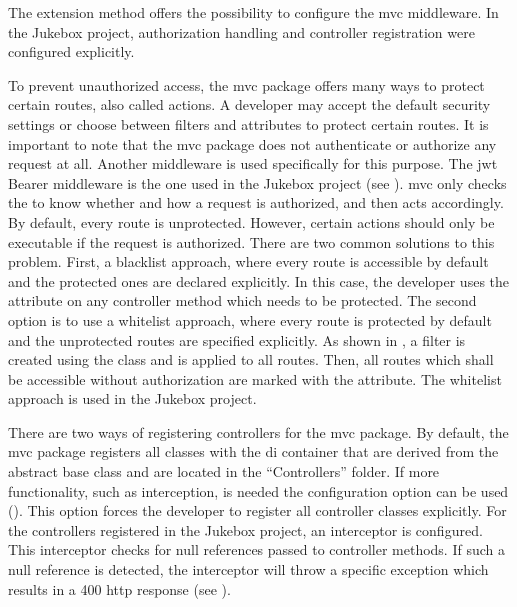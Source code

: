 
The  extension method offers the possibility to configure the \gls{mvc} middleware. In the Jukebox project, authorization handling and controller registration were configured explicitly.

To prevent unauthorized access, the \gls{mvc} package offers many ways to protect certain routes, also called actions. A developer may accept the default security settings or choose between filters and attributes to protect certain routes. It is important to note that the \gls{mvc} package does not authenticate or authorize any request at all. Another middleware is used specifically for this purpose. The \gls{jwt} Bearer middleware is the one used in the Jukebox project (see ). \gls{mvc} only checks the  to know whether and how a request is authorized, and then acts accordingly. By default, every route is unprotected. However, certain actions should only be executable if the request is authorized. There are two common solutions to this problem. First, a blacklist approach, where every route is accessible by default and the protected ones are declared explicitly. In this case, the developer uses the \lstcode{[Authorize]} attribute on any controller method which needs to be protected. The second option is to use a whitelist approach, where every route is protected by default and the unprotected routes are specified explicitly. As shown in , a filter is created using the  class and is applied to all routes. Then, all routes which shall be accessible without authorization are marked with the \lstcode{[AllowAnonymous]} attribute. The whitelist approach is used in the Jukebox project.

There are two ways of registering controllers for the \gls{mvc} package. By default, the \gls{mvc} package registers all classes with the \gls{di} container that are derived from the abstract  base class and are located in the \enquote{Controllers} folder. If more functionality, such as interception, is needed the  configuration option can be used (). This option forces the developer to register all controller classes explicitly. For the controllers registered in the Jukebox project, an interceptor is configured. This interceptor checks for null references passed to controller methods. If such a null reference is detected, the interceptor will throw a specific exception which results in a 400 \gls{http} response (see ).


